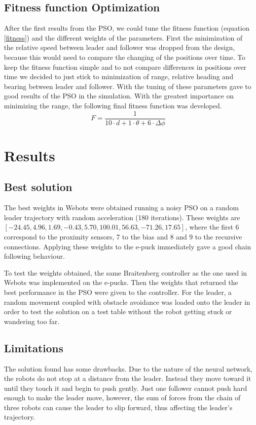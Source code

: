 \documentclass[a4paper, 10pt, conference]{ieeeconf}      %
\begin{document}
\subsection{Fitness function Optimization}
After the first results from the PSO, we could tune the fitness function (equation \ref{fitness}) and the different weights of the parameters. First the minimization of the relative speed between leader and follower was dropped from the design, because this would need to compare the changing of the positions over time. To keep the fitness function simple and to not compare differences in positions over time we decided to just stick to minimization of range, relative heading and bearing between leader and follower. With the tuning of these parameters gave to good results of the PSO in the simulation. With the greatest importance on minimizing the range, the following final fitness function was developed.
\begin{equation}\label{fitness}
F=\frac{1}{10 \cdot d+1 \cdot \theta+6 \cdot \Delta \phi}
\end{equation}


\section{Results}
\subsection{Best solution} The best weights in Webots were obtained running a noisy PSO on a random leader trajectory with random acceleration (180 iterations). These weights are $[-24.45, 4.96, 1.69, -0.43, 5.70, 100.01, 56.63, -71.26, 17.65]$, where the first 6 correspond to the proximity sensors, 7 to the bias and 8 and 9 to the recursive connections. Applying these weights to the e-puck immediately gave a good chain following behaviour.

To test the weights obtained, the same Braitenberg controller as the one used in Webots was implemented on the e-pucks. Then the weights that returned the best performance in the PSO were given to the controller. For the leader, a random movement coupled with obstacle avoidance was loaded onto the leader in order to test the solution on a test table without the robot getting stuck or wandering too far.

\subsection{Limitations}
The solution found has some drawbacks. Due to the nature of the neural network, the robots do not stop at a distance from the leader. Instead they move toward it until they touch it and begin to push gently. Just one follower cannot push hard enough to make the leader move, however, the sum of forces from the chain of three robots can cause the leader to slip forward, thus affecting the leader's trajectory.
\end{document}

